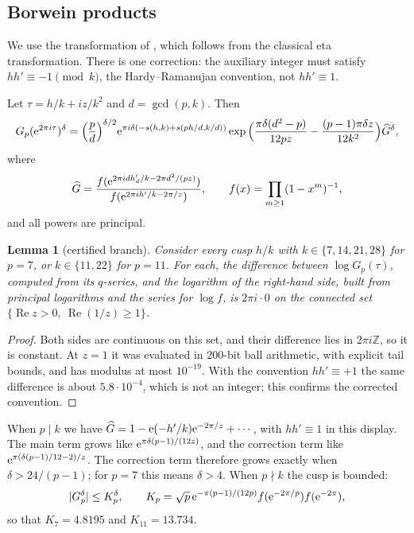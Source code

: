 \documentclass[11pt]{amsart}
\newtheorem{lemma}[theorem]{Lemma}
\theoremstyle{remark}
\newcommand{\Z}{\mathbb Z}\newcommand{\Q}{\mathbb Q}\newcommand{\C}{\mathbb C}
\newcommand{\Rea}{\operatorname{Re}}\newcommand{\Ima}{\operatorname{Im}}
\begin{document}
\subsection{Borwein products}
We use the transformation of \cite[Prop.~7]{SZ}, which follows from the classical eta transformation. There is one correction: the auxiliary integer must satisfy $hh'\equiv-1\pmod k$, the Hardy--Ramanujan convention, not $hh'\equiv1$.

Let $\tau=h/k+iz/k^2$ and $d=\gcd(p,k)$. Then
\[
G_p(\mathrm e^{2\pi i\tau})^\delta=\Big(\frac pd\Big)^{\delta/2}\mathrm e^{\pi i\delta(-s(h,k)+s(ph/d,k/d))}\exp\Big(\frac{\pi\delta(d^2-p)}{12pz}-\frac{(p-1)\pi\delta z}{12k^2}\Big)\widehat G^\delta,
\]
where
\[
\widehat G=\frac{f(\mathrm e^{2\pi idh'_d/k-2\pi d^2/(pz)})}{f(\mathrm e^{2\pi ih'/k-2\pi/z})},\qquad f(x)=\prod_{m\ge1}(1-x^m)^{-1},
\]
and all powers are principal.

\begin{lemma}[certified branch]\label{lem:branch}
Consider every cusp $h/k$ with $k\in\{7,14,21,28\}$ for $p=7$, or $k\in\{11,22\}$ for $p=11$. For each, the difference between $\log G_p(\tau)$, computed from its $q$-series, and the logarithm of the right-hand side, built from principal logarithms and the series for $\log f$, is $2\pi i\cdot0$ on the connected set $\{\Rea z>0,\ \Rea(1/z)\ge1\}$.
\end{lemma}
\begin{proof}
Both sides are continuous on this set, and their difference lies in $2\pi i\Z$, so it is constant. At $z=1$ it was evaluated in $200$-bit ball arithmetic, with explicit tail bounds, and has modulus at most $10^{-19}$. With the convention $hh'\equiv+1$ the same difference is about $5.8\cdot10^{-4}$, which is not an integer; this confirms the corrected convention.
\end{proof}

When $p\mid k$ we have $\widehat G=1-\mathrm e(-h'/k)\mathrm e^{-2\pi/z}+\cdots$, with $hh'\equiv1$ in this display. The main term grows like $\mathrm e^{\pi\delta(p-1)/(12z)}$, and the correction term like $\mathrm e^{\pi(\delta(p-1)/12-2)/z}$. The correction term therefore grows exactly when $\delta>24/(p-1)$; for $p=7$ this means $\delta>4$. When $p\nmid k$ the cusp is bounded:
\[
|G_p^\delta|\le K_p^\delta,\qquad K_p=\sqrt p\,\mathrm e^{-\pi(p-1)/(12p)}f(\mathrm e^{-2\pi/p})f(\mathrm e^{-2\pi}),
\]
so that $K_7=4.8195$ and $K_{11}=13.734$.
\end{document}
